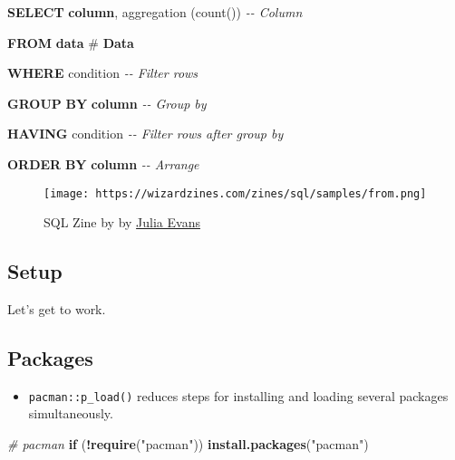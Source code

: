 \documentclass[
]{book}
\newenvironment{Shaded}{\begin{snugshade}}{\end{snugshade}}
\newcommand{\CommentTok}[1]{\textcolor[rgb]{0.56,0.35,0.01}{\textit{#1}}}
\newcommand{\ControlFlowTok}[1]{\textcolor[rgb]{0.13,0.29,0.53}{\textbf{#1}}}
\newcommand{\FunctionTok}[1]{\textcolor[rgb]{0.00,0.00,0.00}{#1}}
\newcommand{\KeywordTok}[1]{\textcolor[rgb]{0.13,0.29,0.53}{\textbf{#1}}}
\newcommand{\NormalTok}[1]{#1}
\newcommand{\OperatorTok}[1]{\textcolor[rgb]{0.81,0.36,0.00}{\textbf{#1}}}
\newcommand{\StringTok}[1]{\textcolor[rgb]{0.31,0.60,0.02}{#1}}
\providecommand{\tightlist}{%
  \setlength{\itemsep}{0pt}\setlength{\parskip}{0pt}}
\begin{document}
\begin{Shaded}
\begin{Highlighting}[]

\KeywordTok{SELECT} \KeywordTok{column}\NormalTok{, aggregation (}\FunctionTok{count}\NormalTok{())\textasciigrave{} }\CommentTok{{-}{-} Column}

\KeywordTok{FROM} \KeywordTok{data}\NormalTok{ \# }\KeywordTok{Data} 

\KeywordTok{WHERE}\NormalTok{ condition }\CommentTok{{-}{-} Filter rows }

\KeywordTok{GROUP} \KeywordTok{BY} \KeywordTok{column} \CommentTok{{-}{-} Group by}

\KeywordTok{HAVING}\NormalTok{ condition }\CommentTok{{-}{-} Filter rows after group by  }

\KeywordTok{ORDER} \KeywordTok{BY} \KeywordTok{column} \CommentTok{{-}{-} Arrange }
\end{Highlighting}
\end{Shaded}

\begin{figure}
\centering
\texttt{[image: https://wizardzines.com/zines/sql/samples/from.png]}
\caption{SQL Zine by by \href{https://jvns.ca/}{Julia Evans}}
\end{figure}

\hypertarget{setup-7}{%
\subsection{Setup}\label{setup-7}}

Let's get to work.

\hypertarget{packages-1}{%
\subsection{Packages}\label{packages-1}}

\begin{itemize}
\tightlist
\item
  \texttt{pacman::p\_load()} reduces steps for installing and loading several packages simultaneously.
\end{itemize}

\begin{Shaded}
\begin{Highlighting}[]
\CommentTok{\# pacman }
\ControlFlowTok{if}\NormalTok{ (}\OperatorTok{!}\KeywordTok{require}\NormalTok{(}\StringTok{"pacman"}\NormalTok{)) }\KeywordTok{install.packages}\NormalTok{(}\StringTok{"pacman"}\NormalTok{)}
\end{Highlighting}
\end{Shaded}
\end{document}

